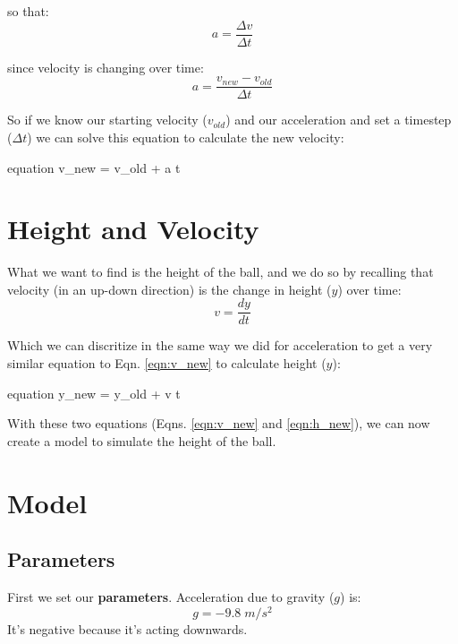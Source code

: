 \documentclass[11pt,fleqn]{book}
\begin{document}
	so that:
	\begin{equation}
	a = \frac{\Delta v}{\Delta t}
	\end{equation}

	since velocity is changing over time:
	\begin{equation}
		a = \frac{v_{new} - v_{old}}{\Delta t}
	\end{equation}

	So if we know our starting velocity ($v_{old}$) and our acceleration and set a timestep ($\Delta t$) we can solve this equation to calculate the new velocity:
	\begin{empheq}[box=\fbox]{equation}
		\label{eqn:v_new}
		v_{new} = v_{old} +  a \cdot \Delta t 
	\end{empheq}


  \section{Height and Velocity}
  	What we want to find is the height of the ball, and we do so by recalling that velocity (in an up-down direction) is the change in height ($y$) over time:
  	\begin{equation}
  		v = \frac{dy}{dt}
  	\end{equation}
  
  	Which we can discritize in the same way we did for acceleration to get a very similar equation to Eqn. \ref{eqn:v_new} to calculate height ($y$):
  	\begin{empheq}[box=\fbox]{equation}
  		\label{eqn:h_new}
  		y_{new} = y_{old} + v \cdot \Delta t
  	\end{empheq}
  	
  	With these two equations (Eqns. \ref{eqn:v_new} and \ref{eqn:h_new}), we can now create a model to simulate the height of the ball.


  \section{Model}
	
	\subsection{Parameters}
	First we set our \textbf{parameters}. Acceleration due to gravity ($g$) is:
	\begin{equation}
		g = -9.8 \; m/s^2
	\end{equation}
	It's negative because it's acting downwards.
	
\end{document}
